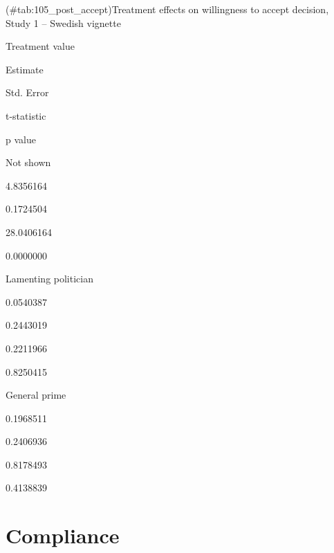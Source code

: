 \documentclass[]{book}
\begin{document}
(\#tab:105\_post\_accept)Treatment effects on willingness to accept
decision, Study 1 -- Swedish vignette

Treatment value

Estimate

Std. Error

t-statistic

p value

Not shown

4.8356164

0.1724504

28.0406164

0.0000000

Lamenting politician

0.0540387

0.2443019

0.2211966

0.8250415

General prime

0.1968511

0.2406936

0.8178493

0.4138839

\section{Compliance}\label{compliance-1}
\end{document}
